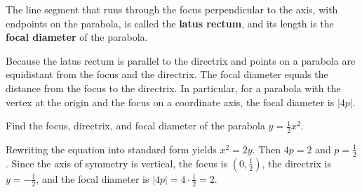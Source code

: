 The line segment that runs through the focus perpendicular to the
axis, with endpoints on the parabola, is called the \textbf{latus rectum}, and its length is the \textbf{focal diameter} of the parabola.

Because the latus rectum is parallel to the directrix and points on a parabola are equidistant from the focus and the directrix. The focal diameter equals the distance from the focus to the directrix. In particular, for a parabola with the vertex at the origin and the focus on a coordinate axis, the focal diameter is $|4p|$.

\begin{example}
    Find the focus, directrix, and focal diameter of the parabola $y=\frac{1}{2}x^2$.
\end{example}
\begin{solution}
    Rewriting the equation into standard form yields $x^2=2y$. Then $4p=2$ and $p=\frac{1}{2}$. Since the axis of symmetry is vertical, the focus is $(0, \frac12)$, the directrix is $y=-\frac12$, and the focal diameter is $|4p|=4\cdot\frac12=2$.
\end{solution}

